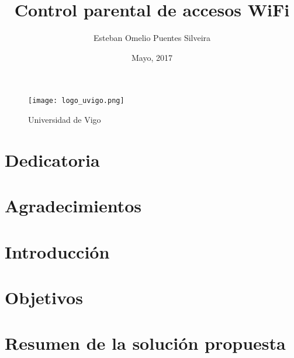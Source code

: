 \documentclass{article}
\title{Control parental de accesos WiFi}
\author{Esteban Omelio Puentes Silveira}
\date{Mayo, 2017}
\begin{document}
\maketitle

\begin{figure}[h!]
    \centering
        \texttt{[image: logo\_uvigo.png]}
        \caption*{Universidad de Vigo}
        \label{fig:uvigo}
\end{figure}

\clearpage


\section{Dedicatoria}

\section{Agradecimientos}

\clearpage



\renewcommand\contentsname{Índice}
\tableofcontents
\printindex



\section{Introducción}


\section{Objetivos}

\section{Resumen de la solución propuesta}
\end{document}
